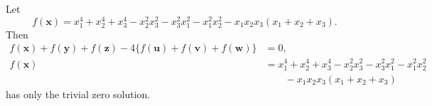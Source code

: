 \begin{proposition}\label{eq:127}
    Let
\[
    f(\mathbf{x})=x_1^4+x_2^4+x_3^4-x_2^2x_3^2-x_3^2x_1^2-x_1^2x_2^2-x_1x_2x_3(x_1+x_2+x_3).
\]
    Then
\[
    \begin{aligned}f(\mathbf{x})+f(\mathbf{y})+f(\mathbf{z})-4\{f(\mathbf{u})+f(\mathbf{v})+f(\mathbf{w})\}&=0,\\f(\mathbf{x})&=x_1^4+x_2^4+x_3^4-x_2^2x_3^2-x_3^2x_1^2-x_1^2x_2^2\\&\qquad-x_1x_2x_3(x_1+x_2+x_3)\end{aligned}
\]
    has only the trivial zero solution.
\end{proposition}
